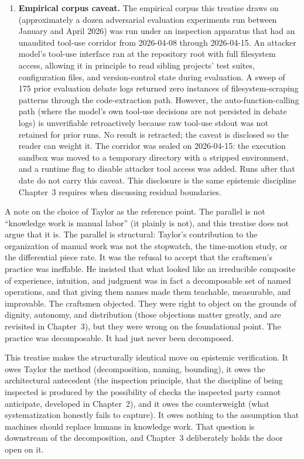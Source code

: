 \documentclass[11pt]{article}
\begin{document}
\begin{enumerate}[resume]
\item \textbf{Empirical corpus caveat.} The empirical corpus this treatise draws on (approximately a dozen adversarial evaluation experiments run between January and April 2026) was run under an inspection apparatus that had an unaudited tool-use corridor from 2026-04-08 through 2026-04-15. An attacker model's tool-use interface ran at the repository root with full filesystem access, allowing it in principle to read sibling projects' test suites, configuration files, and version-control state during evaluation. A sweep of 175 prior evaluation debate logs returned zero instances of filesystem-scraping patterns through the code-extraction path. However, the auto-function-calling path (where the model's own tool-use decisions are not persisted in debate logs) is unverifiable retroactively because raw tool-use stdout was not retained for prior runs. No result is retracted; the caveat is disclosed so the reader can weight it. The corridor was sealed on 2026-04-15: the execution sandbox was moved to a temporary directory with a stripped environment, and a runtime flag to disable attacker tool access was added. Runs after that date do not carry this caveat. This disclosure is the same epistemic discipline Chapter~3 requires when discussing residual boundaries.
\end{enumerate}

A note on the choice of Taylor as the reference point. The parallel is not ``knowledge work is manual labor'' (it plainly is not), and this treatise does not argue that it is. The parallel is structural: Taylor's contribution to the organization of manual work was not the stopwatch, the time-motion study, or the differential piece rate. It was the refusal to accept that the craftsmen's practice was ineffable. He insisted that what looked like an irreducible composite of experience, intuition, and judgment was in fact a decomposable set of named operations, and that giving them names made them teachable, measurable, and improvable. The craftsmen objected. They were right to object on the grounds of dignity, autonomy, and distribution (those objections matter greatly, and are revisited in Chapter~3), but they were wrong on the foundational point. The practice was decomposable. It had just never been decomposed.

This treatise makes the structurally identical move on epistemic verification. It owes Taylor the method (decomposition, naming, bounding), it owes \citet{bentham1787} the architectural antecedent (the inspection principle, that the discipline of being inspected is produced by the possibility of checks the inspected party cannot anticipate, developed in Chapter~2), and it owes \citet{drucker1959} the counterweight (what systematization honestly fails to capture). It owes nothing to the assumption that machines should replace humans in knowledge work. That question is downstream of the decomposition, and Chapter~3 deliberately holds the door open on it.
\end{document}
